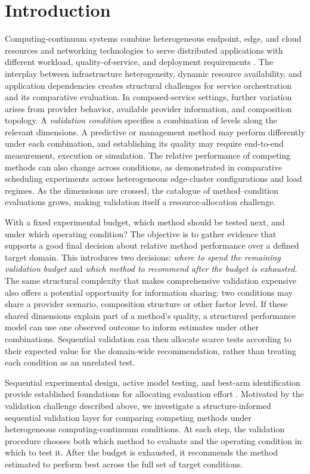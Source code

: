 \documentclass[10pt,a4paper]{article}
\begin{document}
\section{Introduction}
Computing-continuum systems combine heterogeneous endpoint, edge, and cloud resources and networking technologies to serve distributed applications with different workload, quality-of-service, and deployment requirements \cite{alDulaimy2024,bittencourt2025}. The interplay between infrastructure heterogeneity, dynamic resource availability, and application dependencies creates structural challenges for service orchestration and its comparative evaluation. \cite{sedlak2026} In composed-service settings, further variation arises from provider behavior, available provider information, and composition topology. A \emph{validation condition} specifies a combination of levels along the relevant dimensions. A predictive or management method may perform differently under each combination, and establishing its quality may require end-to-end measurement, execution or simulation. The relative performance of competing methods can also change across conditions, as demonstrated in comparative scheduling experiments across heterogeneous edge-cluster configurations and load regimes. \cite{wang2026} As the dimensions are crossed, the catalogue of method--condition evaluations grows, making validation itself a resource-allocation challenge.

With a fixed experimental budget, which method should be tested next, and under which operating condition? The objective is to gather evidence that supports a good final decision about relative method performance over a defined target domain. This introduces two decisions: \emph{where to spend the remaining validation budget} and \emph{which method to recommend after the budget is exhausted}. The same structural complexity that makes comprehensive validation expensive also offers a potential opportunity for information sharing: two conditions may share a provider scenario, composition structure or other factor level. If these shared dimensions explain part of a method's quality, a structured performance model can use one observed outcome to inform estimates under other combinations. Sequential validation can then allocate scarce tests according to their expected value for the domain-wide recommendation, rather than treating each condition as an unrelated test.

Sequential experimental design, active model testing, and best-arm identification provide established foundations for allocating evaluation effort \cite{hara2024,kossen2021,frazier2008}. Motivated by the validation challenge described above, we investigate a structure-informed sequential validation layer for comparing competing methods under heterogeneous computing-continuum conditions. At each step, the validation procedure chooses both which method to evaluate and the operating condition in which to test it. After the budget is exhausted, it recommends the method estimated to perform best across the full set of target conditions.
\end{document}
